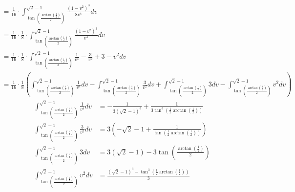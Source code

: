 \documentclass[a4paper,times,12pt]{article}
\begin{document}
\begin{gather*}
	=\frac{1}{16}\cdot \int _{\tan \left(\frac{\arctan \left(\frac{1}{2}\right)}{2}\right)}^{\sqrt{2}-1}\frac{\left(1-v^2\right)^3}{8v^4}dv \\
	=\frac{1}{16}\cdot \frac{1}{8}\cdot \int _{\tan \left(\frac{\arctan \left(\frac{1}{2}\right)}{2}\right)}^{\sqrt{2}-1}\frac{\left(1-v^2\right)^3}{v^4}dv \\
	=\frac{1}{16}\cdot \frac{1}{8}\cdot \int _{\tan \left(\frac{\arctan \left(\frac{1}{2}\right)}{2}\right)}^{\sqrt{2}-1}\frac{1}{v^4}-\frac{3}{v^2}+3-v^2dv \\
	=\frac{1}{16}\cdot\frac{1}{8}\left(\int_{\tan\left(\frac{\arctan\left(\frac{1}{2}\right)}{2}\right)}^{\sqrt{2}-1}\frac{1}{v^4}dv-\int_{\tan\left(\frac{\arctan\left(\frac{1}{2}\right)}{2}\right)}^{\sqrt{2}-1}\frac{3}{v^2}dv+\int_{\tan\left(\frac{\arctan\left(\frac{1}{2}\right)}{2}\right)}^{\sqrt{2}-1}3dv-\int_{\tan\left(\frac{\arctan\left(\frac{1}{2}\right)}{2}\right)}^{\sqrt{2}-1}v^2dv\right)
\end{gather*}
\begin{align*}
	\int _{\tan \left(\frac{\arctan \left(\frac{1}{2}\right)}{2}\right)}^{\sqrt{2}-1}\frac{1}{v^4}dv&=-\frac{1}{3\left(\sqrt{2}-1\right)^3}+\frac{1}{3\tan ^3\left(\frac{1}{2}\arctan \left(\frac{1}{2}\right)\right)} \\
	\int _{\tan \left(\frac{\arctan \left(\frac{1}{2}\right)}{2}\right)}^{\sqrt{2}-1}\frac{3}{v^2}dv&=3\left(-\sqrt{2}-1+\frac{1}{\tan \left(\frac{1}{2}\arctan \left(\frac{1}{2}\right)\right)}\right) \\
	\int _{\tan \left(\frac{\arctan \left(\frac{1}{2}\right)}{2}\right)}^{\sqrt{2}-1}3dv&=3\left(\sqrt{2}-1\right)-3\tan \left(\frac{\arctan \left(\frac{1}{2}\right)}{2}\right)\\
	\int _{\tan \left(\frac{\arctan \left(\frac{1}{2}\right)}{2}\right)}^{\sqrt{2}-1}v^2dv&=\frac{\left(\sqrt{2}-1\right)^3-\tan ^3\left(\frac{1}{2}\arctan \left(\frac{1}{2}\right)\right)}{3}
\end{align*}
\newpage
{}
\newpage
\end{document}
